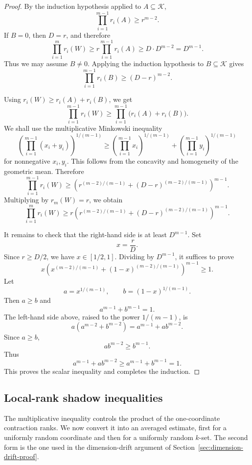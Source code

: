 \documentclass[11pt]{article}
\begin{document}
\begin{proof}
	By the induction hypothesis applied to \(A\subseteq\mathcal K\),
	\[
	\prod_{i=1}^{m-1} r_i(A)\geq r^{m-2}.
	\]
	If \(B=0\), then \(D=r\), and therefore
	\[
	\prod_{i=1}^m r_i(W)
	\geq
	r\prod_{i=1}^{m-1}r_i(A)
	\geq
	D\cdot D^{m-2}
	=
	D^{m-1}.
	\]
	Thus we may assume \(B\neq0\).  Applying the induction hypothesis to
	\(B\subseteq\mathcal K\) gives
	\[
	\prod_{i=1}^{m-1} r_i(B)\geq (D-r)^{m-2}.
	\]
	
	Using \(r_i(W)\geq r_i(A)+r_i(B)\), we get
	\[
	\prod_{i=1}^{m-1} r_i(W)
	\geq
	\prod_{i=1}^{m-1}\bigl(r_i(A)+r_i(B)\bigr).
	\]
	We shall use the multiplicative Minkowski inequality
	\[
	\left(
	\prod_{i=1}^{m-1}(x_i+y_i)
	\right)^{1/(m-1)}
	\geq
	\left(
	\prod_{i=1}^{m-1}x_i
	\right)^{1/(m-1)}
	+
	\left(
	\prod_{i=1}^{m-1}y_i
	\right)^{1/(m-1)}
	\]
	for nonnegative \(x_i,y_i\).  This follows from the concavity and homogeneity
	of the geometric mean.  Therefore
	\[
	\prod_{i=1}^{m-1} r_i(W)
	\geq
	\left(
	r^{(m-2)/(m-1)}
	+
	(D-r)^{(m-2)/(m-1)}
	\right)^{m-1}.
	\]
	Multiplying by \(r_m(W)=r\), we obtain
	\[
	\prod_{i=1}^m r_i(W)
	\geq
	r
	\left(
	r^{(m-2)/(m-1)}
	+
	(D-r)^{(m-2)/(m-1)}
	\right)^{m-1}.
	\]
	
	It remains to check that the right-hand side is at least \(D^{m-1}\).  Set
	\[
	x=\frac rD.
	\]
	Since \(r\geq D/2\), we have \(x\in[1/2,1]\).  Dividing by \(D^{m-1}\), it
	suffices to prove
	\[
	x
	\left(
	x^{(m-2)/(m-1)}
	+
	(1-x)^{(m-2)/(m-1)}
	\right)^{m-1}
	\geq 1.
	\]
	Let
	\[
	a=x^{1/(m-1)},
	\qquad
	b=(1-x)^{1/(m-1)}.
	\]
	Then \(a\geq b\) and
	\[
	a^{m-1}+b^{m-1}=1.
	\]
	The left-hand side above, raised to the power \(1/(m-1)\), is
	\[
	a(a^{m-2}+b^{m-2})
	=
	a^{m-1}+ab^{m-2}.
	\]
	Since \(a\geq b\),
	\[
	ab^{m-2}\geq b^{m-1}.
	\]
	Thus
	\[
	a^{m-1}+ab^{m-2}
	\geq
	a^{m-1}+b^{m-1}
	=
	1.
	\]
	This proves the scalar inequality and completes the induction.
\end{proof}

\subsection{Local-rank shadow inequalities}
\label{sec:shadow}

The multiplicative inequality controls the product of the one-coordinate
contraction ranks.  We now convert it into an averaged estimate, first for a
uniformly random coordinate and then for a uniformly random \(k\)-set.  The
second form is the one used in the dimension-drift argument of
Section~\ref{sec:dimension-drift-proof}.
\end{document}
